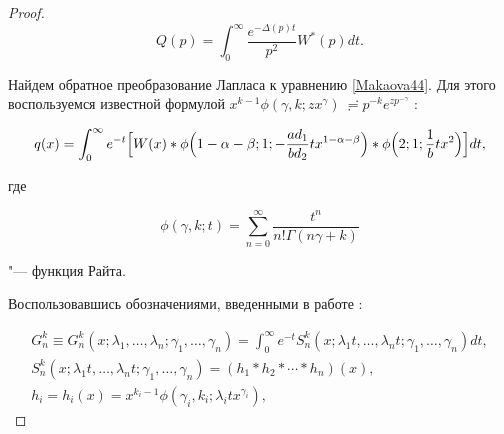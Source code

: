 \begin{proof}
\begin{equation}
Q(p)=\int _{0}^{\infty}\frac{e^{-\Delta(p)t}}

{p^{2}} W^*(p)dt.

 \end{equation} 



Найдем  обратное преобразование  Лапласа к уравнению \eqref{Makaova44}. Для этого  воспользуемся известной формулой $x^{k-1} \phi(\gamma, k;zx^\gamma) 

\ \risingdotseq p^{-k}e^{zp^{-\gamma}}$ \cite{Wright_26}:  

\begin{equation}

\label{Makaova45} 

q(x)=\int _{0}^{\infty}e^{-t} 

\Bigl[

W(x)*\phi \Bigl(1-\alpha-\beta;1; -\frac{ad_1}{bd_2} tx^{1-\alpha-\beta}\Bigr)* \\

\phi \Bigl(2;1;\frac{1}{b} tx^2 \Bigr)

\Bigr] dt,

\end{equation}

где

\[

\phi(\gamma, k;t) =\sum^\infty_{n=0}

\frac{t^n}{n! \Gamma(n\gamma+k)}

\]

"--- функция  Райта.







Воспользовавшись  обозначениями, введенными в работе \cite{Pskhu_27}:

\begin{gather}

G_n^k \equiv G_n^k(x; \lambda_1, \dots, \lambda_n;\gamma_1, \dots, \gamma_n)=

\int _{0}^{\infty}e^{-t} S_n^k(x; \lambda_1t, \dots, \lambda_nt;\gamma_1, \dots, \gamma_n)dt,

\\

S_n^k(x; \lambda_1t, \dots, \lambda_nt;\gamma_1, \dots, \gamma_n)=

(h_1 \ast h_2 \ast \cdots \ast h_n)(x),

\\

h_i=h_i(x)=x^{k_i-1} \phi(\gamma_i, k_i; \lambda_itx^{\gamma_i}), \quad 


\end{gather}
\end{proof}
